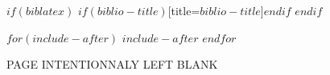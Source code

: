 \documentclass[$if(fontsize)$$fontsize$,$endif$$if(lang)$$babel-lang$,$endif$$if(papersize)$$papersize$paper,$endif$$for(classoption)$$classoption$$sep$,$endfor$]{$documentclass$}
\begin{document}
\iftotalfigures{}\listoffigures\newpage\fi
\iftotaltables{}\listoftables\newpage\fi


$if(biblatex)$
    \printbibliography$if(biblio-title)$[title=$biblio-title$]$endif$
    \newpage
$endif$

$for(include-after)$
    $include-after$
    \newpage
$endfor$

\newpage
\thispagestyle{empty}
\clearpage
\vspace*{\fill}
\begin{center}
\begin{minipage}{.6\textwidth}
\centering PAGE INTENTIONNALY LEFT BLANK
\end{minipage}
\end{center}
\vfill %
\clearpage
\end{document}
